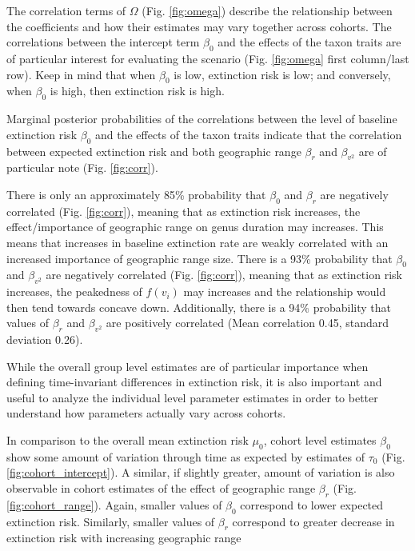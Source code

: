 \documentclass{article}
\begin{document}
The correlation terms of \(\Omega\) (Fig. \ref{fig:omega}) describe the relationship between the coefficients and how their estimates may vary together across cohorts. The correlations between the intercept term \(\beta_{0}\) and the effects of the taxon traits are of particular interest for evaluating the \citet{Jablonski1986} scenario (Fig. \ref{fig:omega} first column/last row). Keep in mind that when \(\beta_{0}\) is low, extinction risk is low; and conversely, when \(\beta_{0}\) is high, then extinction risk is high.

Marginal posterior probabilities of the correlations between the level of baseline extinction risk \(\beta_{0}\) and the effects of the taxon traits indicate that the correlation between expected extinction risk and both geographic range \(\beta_{r}\) and \(\beta_{v^{2}}\) are of particular note (Fig. \ref{fig:corr}). 

There is only an approximately 85\% probability that \(\beta_{0}\) and \(\beta_{r}\) are negatively correlated (Fig. \ref{fig:corr}), meaning that as extinction risk increases, the effect/importance of geographic range on genus duration may increases. This means that increases in baseline extinction rate are weakly correlated with an increased importance of geographic range size. There is a 93\% probability that \(\beta_{0}\) and \(\beta_{v^{2}}\) are negatively correlated (Fig. \ref{fig:corr}), meaning that as extinction risk increases, the peakedness of \(f(v_{i})\) may increases and the relationship would then tend towards concave down. Additionally, there is a 94\% probability that values of \(\beta_{r}\) and \(\beta_{v^{2}}\) are positively correlated (Mean correlation 0.45, standard deviation 0.26).

While the overall group level estimates are of particular importance when defining time-invariant differences in extinction risk, it is also important and useful to analyze the individual level parameter estimates in order to better understand how parameters actually vary across cohorts.

In comparison to the overall mean extinction risk \(\mu_{0}\), cohort level estimates \(\beta_{0}\) show some amount of variation through time as expected by estimates of \(\tau_{0}\) (Fig. \ref{fig:cohort_intercept}). A similar, if slightly greater, amount of variation is also observable in cohort estimates of the effect of geographic range \(\beta_{r}\) (Fig. \ref{fig:cohort_range}). Again, smaller values of \(\beta_{0}\) correspond to lower expected extinction risk. Similarly, smaller values of \(\beta_{r}\) correspond to greater decrease in extinction risk with increasing geographic range 
\end{document}
